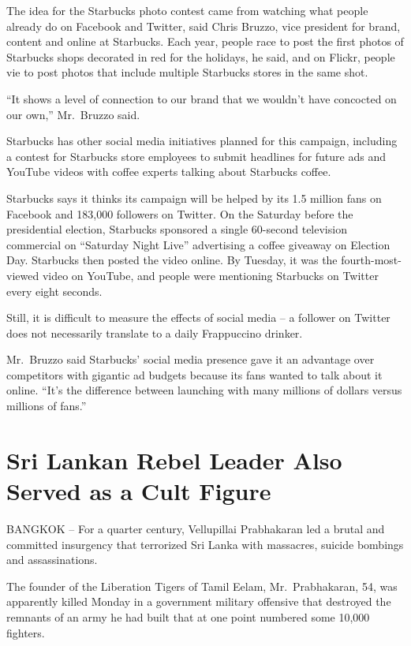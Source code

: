 \documentclass[12pt,a4paper,onecolumn]{article}
\begin{document}
The idea for the Starbucks photo contest came from watching what people already do on Facebook and
Twitter, said Chris Bruzzo, vice president for brand, content and online at Starbucks. Each year,
people race to post the first photos of Starbucks shops decorated in red for the holidays, he said,
and on Flickr, people vie to post photos that include multiple Starbucks stores in the same shot.

``It shows a level of connection to our brand that we wouldn't have concocted on our own,''
Mr.~Bruzzo said.

Starbucks has other social media initiatives planned for this campaign, including a contest for
Starbucks store employees to submit headlines for future ads and YouTube videos with coffee experts
talking about Starbucks coffee.

Starbucks says it thinks its campaign will be helped by its 1.5 million fans on Facebook and 183,000
followers on Twitter. On the Saturday before the presidential election, Starbucks sponsored a single
60-second television commercial on ``Saturday Night Live'' advertising a coffee giveaway on Election
Day. Starbucks then posted the video online. By Tuesday, it was the fourth-most-viewed video on
YouTube, and people were mentioning Starbucks on Twitter every eight seconds.

Still, it is difficult to measure the effects of social media -- a follower on Twitter does not
necessarily translate to a daily Frappuccino drinker.

Mr.~Bruzzo said Starbucks' social media presence gave it an advantage over competitors with gigantic
ad budgets because its fans wanted to talk about it online. ``It's the difference between launching
with many millions of dollars versus millions of fans.''

\section{Sri Lankan Rebel Leader Also Served as a Cult Figure}

BANGKOK -- For a quarter century, Vellupillai Prabhakaran led a brutal and committed insurgency that
terrorized Sri Lanka with massacres, suicide bombings and assassinations.

The founder of the Liberation Tigers of Tamil Eelam, Mr.~Prabhakaran, 54, was apparently killed
Monday in a government military offensive that destroyed the remnants of an army he had built that
at one point numbered some 10,000 fighters.
\end{document}
